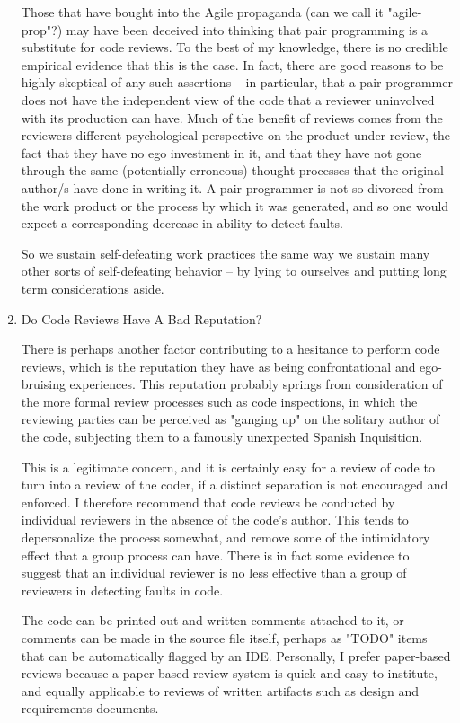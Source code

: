\documentclass{article}
\begin{document}
\begin{enumerate}
Those that have bought into the Agile propaganda (can we call it
"agile-prop"?) may have been deceived into thinking that pair
programming is a substitute for code reviews. To the best of my
knowledge, there is no credible empirical evidence that this is the
case. In fact, there are good reasons to be highly skeptical of any such
assertions -- in particular, that a pair programmer does not have the
independent view of the code that a reviewer uninvolved with its
production can have. Much of the benefit of reviews comes from the
reviewers different psychological perspective on the product under
review, the fact that they have no ego investment in it, and that they
have not gone through the same (potentially erroneous) thought processes
that the original author/s have done in writing it. A pair programmer is
not so divorced from the work product or the process by which it was
generated, and so one would expect a corresponding decrease in ability
to detect faults.

So we sustain self-defeating work practices the same way we sustain many
other sorts of self-defeating behavior -- by lying to ourselves and
putting long term considerations aside.

\item Do Code Reviews Have A Bad Reputation?
\label{sec:orgheadline275}

There is perhaps another factor contributing to a hesitance to perform
code reviews, which is the reputation they have as being confrontational
and ego-bruising experiences. This reputation probably springs from
consideration of the more formal review processes such as code
inspections, in which the reviewing parties can be perceived as "ganging
up" on the solitary author of the code, subjecting them to a famously
unexpected Spanish Inquisition.

This is a legitimate concern, and it is certainly easy for a review of
code to turn into a review of the coder, if a distinct separation is not
encouraged and enforced. I therefore recommend that code reviews be
conducted by individual reviewers in the absence of the code's author.
This tends to depersonalize the process somewhat, and remove some of the
intimidatory effect that a group process can have. There is in fact some
evidence to suggest that an individual reviewer is no less effective
than a group of reviewers in detecting faults in code.

The code can be printed out and written comments attached to it, or
comments can be made in the source file itself, perhaps as "TODO" items
that can be automatically flagged by an IDE. Personally, I prefer
paper-based reviews because a paper-based review system is quick and
easy to institute, and equally applicable to reviews of written
artifacts such as design and requirements documents.


\end{enumerate}
\end{document}
